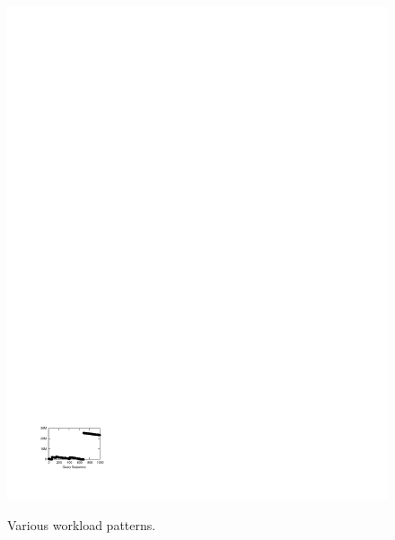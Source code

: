 \begin{figure}[t]
\begin{center}
{            \includegraphics[trim=2cm 2cm 16.3cm 24cm]{Figures/holistic/skyserver_predicates}
        }%
\vspace{-0.25 in}
    \caption{Various workload patterns.}
\vspace{-0.7 cm}
   \label{fig:rob1}
    \end{center}
\end{figure}

